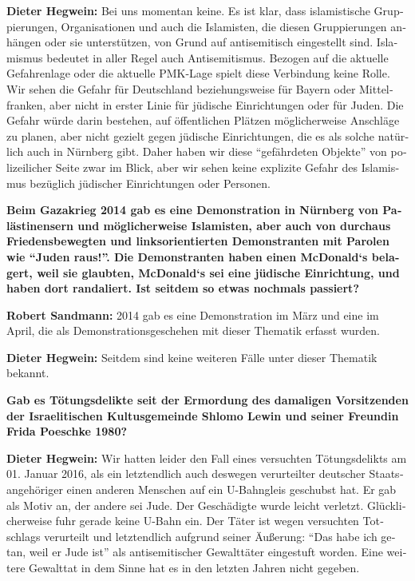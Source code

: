 \begin{otherlanguage}{ngerman}
\textbf{Dieter Hegwein:} Bei uns momentan keine. Es ist klar, dass islamistische Gruppierungen, Organisationen und auch die Islamisten, die diesen Gruppierungen anhängen oder sie unterstützen, von Grund auf antisemitisch eingestellt sind. Islamismus bedeutet in aller Regel auch Antisemitismus. Bezogen auf die aktuelle Gefahrenlage oder die aktuelle PMK-Lage spielt diese Verbindung keine Rolle. Wir sehen die Gefahr für Deutschland beziehungsweise für Bayern oder Mittelfranken, aber nicht in erster Linie für jüdische Einrichtungen oder für Juden. Die Gefahr würde darin bestehen, auf öffentlichen Plätzen möglicherweise Anschläge zu planen, aber nicht gezielt gegen jüdische Einrichtungen, die es als solche natürlich auch in Nürnberg gibt. Daher haben wir diese "`gefährdeten Objekte"' von polizeilicher Seite zwar im Blick, aber wir sehen keine explizite Gefahr des Islamismus bezüglich jüdischer Einrichtungen oder Personen.

\textbf{Beim Gazakrieg 2014 gab es eine Demonstration in Nürnberg von Palästinensern und möglicherweise Islamisten, aber auch von durchaus Friedensbewegten und linksorientierten Demonstranten mit Parolen wie "`Juden raus!"'. Die Demonstranten haben einen McDonald‘s belagert, weil sie glaubten, McDonald‘s sei eine jüdische Einrichtung, und haben dort randaliert. Ist seitdem so etwas nochmals passiert?}

\textbf{Robert Sandmann:} 2014 gab es eine Demonstration im März und eine im April, die als Demonstrationsgeschehen mit dieser Thematik erfasst wurden.

\textbf{Dieter Hegwein:} Seitdem sind keine weiteren Fälle unter dieser Thematik bekannt.

\textbf{Gab es Tötungsdelikte seit der Ermordung des damaligen Vorsitzenden der Israelitischen Kultusgemeinde Shlomo Lewin und seiner Freundin Frida Poeschke 1980?}

\textbf{Dieter Hegwein:} Wir hatten leider den Fall eines versuchten Tötungsdelikts am 01. Januar 2016, als ein letztendlich auch deswegen verurteilter deutscher Staatsangehöriger einen anderen Menschen auf ein U-Bahngleis geschubst hat. Er gab als Motiv an, der andere sei Jude. Der Geschädigte wurde leicht verletzt. Glücklicherweise fuhr gerade keine U-Bahn ein. Der Täter ist wegen versuchten Totschlags verurteilt und letztendlich aufgrund seiner Äußerung: "`Das habe ich getan, weil er Jude ist"' als antisemitischer Gewalttäter eingestuft worden. Eine weitere Gewalttat in dem Sinne hat es in den letzten Jahren nicht gegeben. 


\end{otherlanguage}
